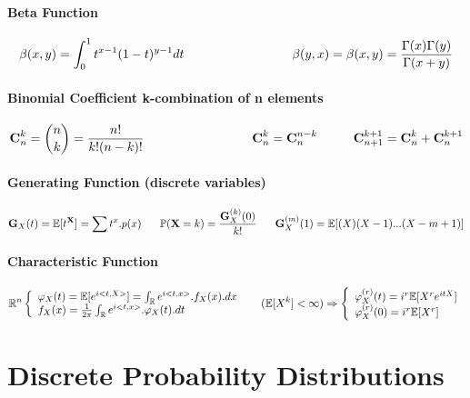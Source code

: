 \documentclass[a4paper,10pt]{article}
\begin{document}
\paragraph{Beta Function}
\[
\beta(x,y)=  \int_{0}^{1}  t^{x-1}(1-t)^{y-1}dt  \hspace{30mm} \beta(y,x)=\beta(x,y)= \frac{\Gamma(x)\Gamma(y)}{\Gamma(x+y)}
\]
\paragraph{Binomial Coefficient k-combination of n elements}
\[
\textbf{C}^{k}_{n} = \binom{n}{k} = \frac{n!}{k!(n-k)!}
\hspace{30mm} \textbf{C}^{k}_{n} = \textbf{C}^{n-k}_{n} 
\hspace{10mm} \textbf{C}^{k+1}_{n+1} = \textbf{C}^{k}_{n} + \textbf{C}^{k+1}_{n} 
\]

\paragraph{Generating Function (discrete variables)}
\[
\textbf{G}_{X}(t)= \mathbb{E}[t^{\textbf{X}}] = \sum t^{x}.p(x)
\hspace{6mm} \mathbb{P}(\textbf{X}=k) = \frac{\textbf{G}_{X}^{(k)}(0)}{k!}
\hspace{6mm} \textbf{G}_{X}^{(m)}(1)  = \mathbb{E}[(X)(X-1)...(X-m+1)]
\]
\paragraph{Characteristic Function}
\[
\mathbb{R}^{n}
\left\{
\begin{array}{l}
\varphi_{X}(t)= \mathbb{E}[e^{i<t,X>}] = \int_{\mathbb{R}} e^{i<t,x>} . f_{X}(x).dx \\
f_{X}(x) = \frac{1}{2\pi}\int_{\mathbb{R}} e^{i<t,x>} . \varphi_{X}(t).dt
\end{array}\right. 
\hspace{5mm}
(\mathbb{E}[X^{k}]< \infty) \Rightarrow 
\left\{
\begin{array}{l}
\varphi_{X}^{(r)}(t)= i^{r}\mathbb{E}[X^{r}e^{itX}] \\
\varphi_{X}^{(r)}(0)= i^{r}\mathbb{E}[X^{r}]
\end{array}\right. 
\]


\section{Discrete Probability Distributions}
\end{document}
